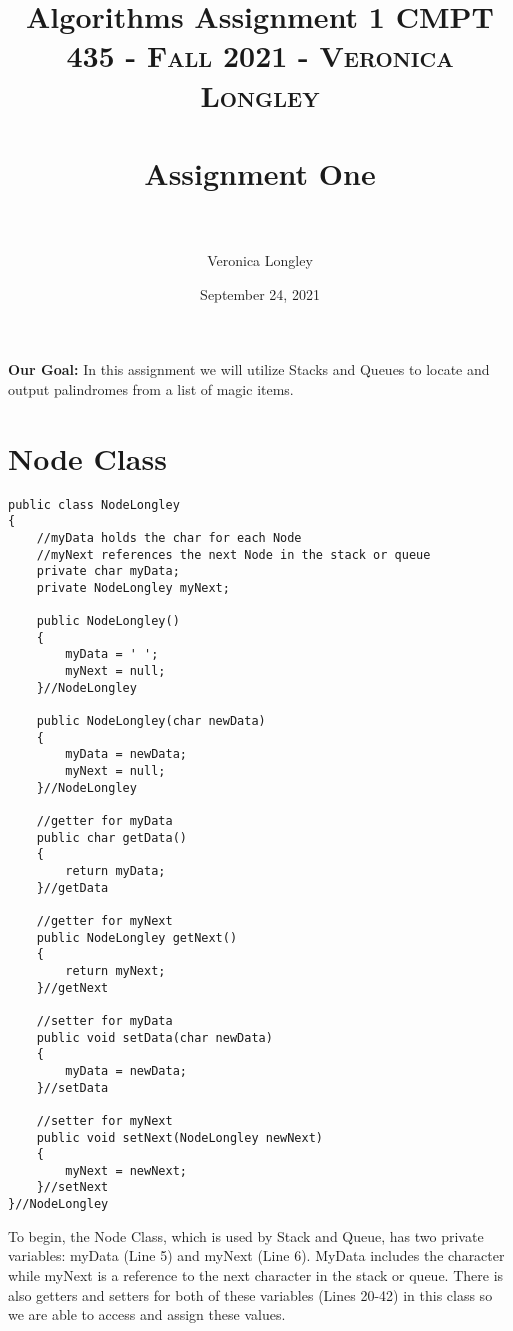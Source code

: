 \documentclass{article}
\title{\textbf{Algorithms Assignment 1}}
\author{Veronica Longley }
\date{September 24, 2021}
\title{	
   \normalfont \normalsize 
   \textsc{CMPT 435 - Fall 2021 - Veronica Longley} \\[10pt] %
   \horrule{0.5pt} \\[0.25cm] 	%
   \huge Assignment One    	    \\ %
   \horrule{0.5pt} \\[0.25cm] 	%
}
\begin{document}
\lstset{numbers= left}
\lstset{language=Java}
\huge
\newcommand{\horrule}[1]{\rule{\linewidth}{#1}}

\maketitle{}


 


\pagebreak
\large
\textbf{Our Goal:}
In this assignment we will utilize Stacks and Queues to locate and output palindromes from a list of magic items. 
\small
\section{Node Class}
\begin{lstlisting}[frame =single,
backgroundcolor = \color{grey!12}]
public class NodeLongley
{
	//myData holds the char for each Node
	//myNext references the next Node in the stack or queue
	private char myData;
	private NodeLongley myNext;

	public NodeLongley()
	{
		myData = ' ';
		myNext = null;
	}//NodeLongley
	
	public NodeLongley(char newData)
	{
		myData = newData;
		myNext = null;
	}//NodeLongley

	//getter for myData 
	public char getData()
	{
		return myData;
	}//getData
	
	//getter for myNext
	public NodeLongley getNext()
	{
		return myNext;
	}//getNext
	
	//setter for myData 
	public void setData(char newData)
	{
		myData = newData;
	}//setData
	
	//setter for myNext
	public void setNext(NodeLongley newNext)
	{
		myNext = newNext;
	}//setNext
}//NodeLongley
\end{lstlisting}
\large
To begin, the Node Class, which is used by Stack and Queue, has two private variables: myData (Line 5) and myNext (Line 6). MyData includes the character while myNext is a reference to the next character in the stack or queue. There is also getters and setters for both of these variables (Lines 20-42) in this class so we are able to access and assign these values. 


\pagebreak
\end{document}
